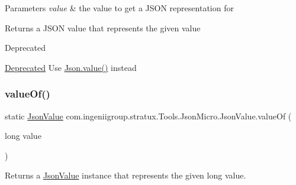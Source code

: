 \begin{DoxyParams}{Parameters}
{\em value} & the value to get a J\+S\+ON representation for \\
\hline
\end{DoxyParams}
\begin{DoxyReturn}{Returns}
a J\+S\+ON value that represents the given value 
\end{DoxyReturn}
\begin{DoxyRefDesc}{Deprecated}
\item[\hyperlink{deprecated__deprecated000010}{Deprecated}]Use {\ttfamily \hyperlink{classcom_1_1ingeniigroup_1_1stratux_1_1_tools_1_1_json_micro_1_1_json_aa7a17dbf2bbb667284cb5a86d404bf6d}{Json.\+value()}} instead \end{DoxyRefDesc}
\mbox{\label{classcom_1_1ingeniigroup_1_1stratux_1_1_tools_1_1_json_micro_1_1_json_value_adc1157e16f80ccfb71d38da3f0bc67bd}} 
\subsubsection{\texorpdfstring{value\+Of()}{valueOf()}\hspace{0.1cm}{\footnotesize\ttfamily [2/6]}}
{\footnotesize\ttfamily static \hyperlink{classcom_1_1ingeniigroup_1_1stratux_1_1_tools_1_1_json_micro_1_1_json_value}{Json\+Value} com.\+ingeniigroup.\+stratux.\+Tools.\+Json\+Micro.\+Json\+Value.\+value\+Of (\begin{DoxyParamCaption}\item[{long}]{value }\end{DoxyParamCaption})\hspace{0.3cm}{\ttfamily [static]}}

Returns a \hyperlink{classcom_1_1ingeniigroup_1_1stratux_1_1_tools_1_1_json_micro_1_1_json_value}{Json\+Value} instance that represents the given {\ttfamily long} value.


